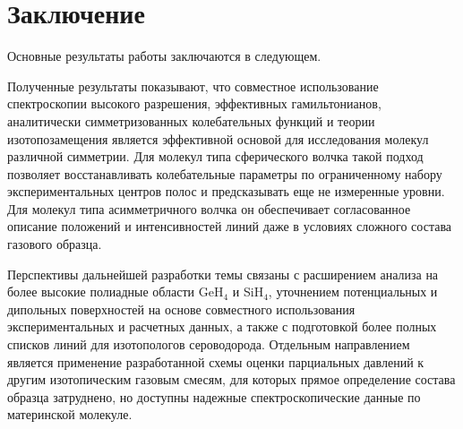 \chapter*{Заключение}                       %

Основные результаты работы заключаются в следующем.


Полученные результаты показывают, что совместное использование спектроскопии высокого разрешения,
эффективных гамильтонианов, аналитически симметризованных колебательных функций и теории
изотопозамещения является эффективной основой для исследования молекул различной симметрии. Для
молекул типа сферического волчка такой подход позволяет восстанавливать колебательные параметры по
ограниченному набору экспериментальных центров полос и предсказывать еще не измеренные уровни. Для
молекул типа асимметричного волчка он обеспечивает согласованное описание положений и интенсивностей
линий даже в условиях сложного состава газового образца.

Перспективы дальнейшей разработки темы связаны с расширением анализа на более высокие полиадные
области GeH$_4$ и SiH$_4$, уточнением потенциальных и дипольных поверхностей на основе совместного
использования экспериментальных и расчетных данных, а также с подготовкой более полных списков линий
для изотопологов сероводорода. Отдельным направлением является применение разработанной схемы оценки
парциальных давлений к другим изотопическим газовым смесям, для которых прямое определение состава
образца затруднено, но доступны надежные спектроскопические данные по материнской молекуле.
